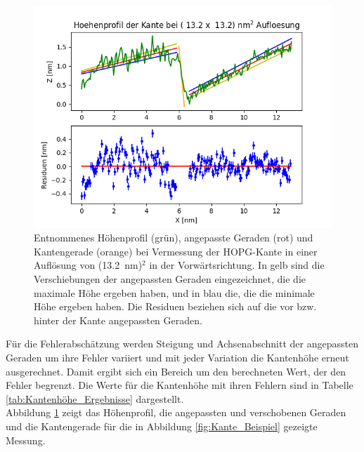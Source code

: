 \documentclass[12pt,a4paper]{article}
\begin{document}
\begin{figure}
\centering
\includegraphics[scale=0.6]{Bilder/Anhang/Kante/Profil_Kante_0132_vor.png}
\caption{Entnommenes Höhenprofil (grün), angepasste Geraden (rot) und Kantengerade (orange) bei Vermessung der HOPG-Kante in einer Auflösung von (\SI{13,2}{nm})$^2$ in der Vorwärtsrichtung. In gelb sind die Verschiebungen der angepassten Geraden eingezeichnet, die die maximale Höhe ergeben haben, und in blau die, die die minimale Höhe ergeben haben. Die Residuen beziehen sich auf die vor bzw. hinter der Kante angepassten Geraden.}
\label{fig:Kante_Hoehenprofil_Beispiel}
\end{figure}

Für die Fehlerabschätzung werden Steigung und Achsenabschnitt der angepassten Geraden  um ihre Fehler variiert und mit jeder Variation die Kantenhöhe erneut ausgerechnet. Damit ergibt sich ein Bereich um den berechneten Wert, der den Fehler begrenzt. Die Werte für die Kantenhöhe mit ihren Fehlern sind in Tabelle \ref{tab:Kantenhöhe_Ergebnisse} dargestellt.\\
Abbildung \ref{fig:Kante_Hoehenprofil_Beispiel} zeigt das Höhenprofil, die angepassten und verschobenen Geraden und die Kantengerade für die in Abbildung \ref{fig:Kante_Beispiel} gezeigte Messung.
\end{document}
